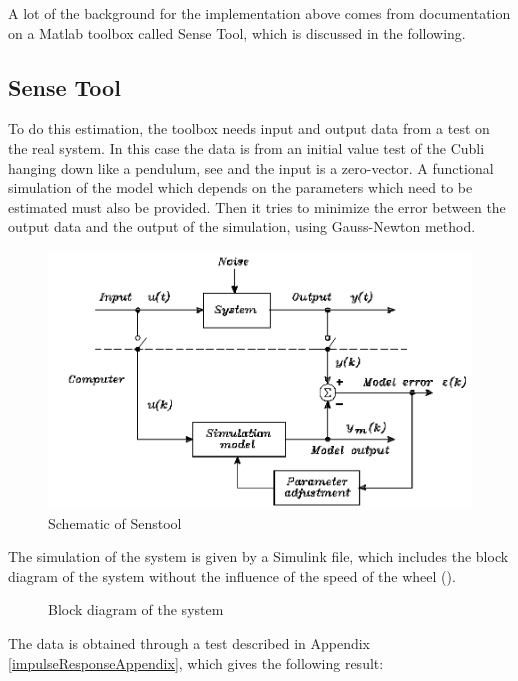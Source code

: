 A lot of the background for the implementation above comes from documentation on a Matlab toolbox called Sense Tool, which is discussed in the following.

\subsection{Sense Tool}
To do this estimation, the toolbox needs input and output data from a test on the real system. In this case the data is from an initial value test of the Cubli hanging down like a pendulum, see  and the input is a zero-vector. A functional simulation of the model which depends on the parameters which need to be estimated must also be provided. Then it tries to minimize the error between the output data and the output of the simulation, using Gauss-Newton method.

\begin{figure}[H]
	\centering
	\includegraphics[scale=0.4]{figures/SensToolSchema}
	\caption{Schematic of Senstool}
	\label{SensToolSchema}
\end{figure}
%
The simulation of the system is given by a Simulink file, which includes the block diagram of the system without the influence of the speed of the wheel ().
%
\begin{figure}[H]
	
		\centering
	\caption{Block diagram of the system}
	\label{blockDiagramSenseTool}
\end{figure}

The data is obtained through a test described in Appendix \ref{impulseResponseAppendix}, which gives the following result:


